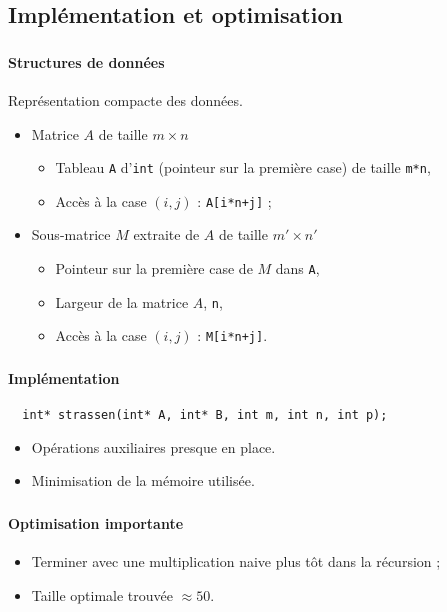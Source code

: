 \documentclass{beamer}
\begin{document}
\subsection{Implémentation et optimisation}
\begin{frame}[fragile]
  \frametitle{\insertsubsection}
  \framesubtitle{Structures de données}
  Représentation compacte des données.
  \begin{itemize}
    \item<2-> Matrice $A$ de taille $m\times n$
    \begin{itemize}
      \item Tableau \verb=A= d'\verb=int=
      (pointeur sur la première case) de taille \verb=m*n=,
      \item Accès à la case $(i,j)$ : \verb=A[i*n+j]= ;
    \end{itemize}
    \item<3-> Sous-matrice $M$ extraite de $A$ de taille $m'\times n'$
    \begin{itemize}
      \item Pointeur sur la première case de $M$ dans \verb=A=,
      \item Largeur de la matrice $A$, \verb=n=,
      \item Accès à la case $(i,j)$ : \verb=M[i*n+j]=.
    \end{itemize}
  \end{itemize}
\end{frame}

\begin{frame}[fragile]
  \frametitle{\insertsubsection}
  \framesubtitle{Implémentation}
  \small\begin{verbatim}
  int* strassen(int* A, int* B, int m, int n, int p);
  \end{verbatim}\normalsize

  \begin{itemize}
    \item Opérations auxiliaires presque en place.
    \item Minimisation de la mémoire utilisée.
  \end{itemize}
\end{frame}

\begin{frame}
  \frametitle{\insertsubsection}
  \framesubtitle{Optimisation importante}
  \begin{itemize}
  \item
  Terminer avec une multiplication naive plus tôt dans la récursion ;
  \item Taille optimale trouvée $\approx 50$.
  \end{itemize}
\end{frame}
\end{document}
